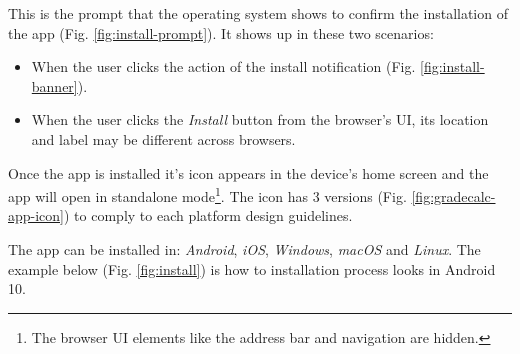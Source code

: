 This is the prompt that the operating system shows to confirm the installation of the app (Fig. \ref{fig:install-prompt}). It shows up in these two scenarios:

\begin{itemize}
    \item When the user clicks the action of the install notification (Fig. \ref{fig:install-banner}).
    \item When the user clicks the \textit{Install} button from the browser's UI, its location and label may be different across browsers.
\end{itemize}

Once the app is installed it's icon appears in the device's home screen and the app will open in standalone mode\footnote{The browser UI elements like the address bar and navigation are hidden.}. The icon has 3 versions (Fig. \ref{fig:gradecalc-app-icon}) to comply to each platform design guidelines. 

The app can be installed in: \textit{Android}, \textit{iOS}, \textit{Windows}, \textit{macOS} and \textit{Linux}. The example below (Fig. \ref{fig:install}) is how to installation process looks in Android 10.


